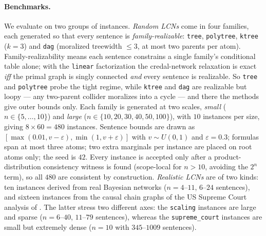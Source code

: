 \documentclass{article}
\begin{document}
\paragraph{Benchmarks.}
We evaluate on two groups of instances. \emph{Random LCNs} come in four
families, each generated so that every sentence is \emph{family-realizable}:
\texttt{tree}, \texttt{polytree}, \texttt{ktree} ($k{=}3$) and \texttt{dag}
(moralized treewidth $\le 3$, at most two parents per atom). Family-realizability means each sentence constrains a single family's conditional
table alone; with the \texttt{linear} factorization the credal-network relaxation
is exact \emph{iff} the primal graph is singly connected \emph{and} every sentence
is realizable. So \texttt{tree} and \texttt{polytree} probe the tight regime, while
\texttt{ktree} and \texttt{dag} are realizable but loopy --- any two-parent collider
moralizes into a cycle --- and there the methods give outer bounds only. Each family is
generated at two scales, \emph{small} ($n \in \{5,\dots,10\}$) and \emph{large}
($n \in \{10,20,30,40,50,100\}$), with $10$ instances per size, giving
$8 \times 60 = 480$ instances. Sentence bounds are drawn as
$[\max(0.01, v{-}\varepsilon), \min(1, v{+}\varepsilon)]$ with $v \sim U(0,1)$
and $\varepsilon = 0.3$; formulas span at most three atoms; two extra marginals
per instance are placed on root atoms only; the seed is $42$. Every instance is accepted only after a product-distribution
consistency witness is found (scope-local for $n > 10$, avoiding the $2^n$ term),
so all $480$ are consistent by construction. \emph{Realistic LCNs} are of two kinds: ten
instances derived from real Bayesian networks \cite{bn-repo} ($n = 4$--$11$,
$6$--$24$ sentences), and sixteen instances from the causal chain graphs of the
US Supreme Court analysis of \cite{ogburn2020causal}. The latter stress two
different axes: the \texttt{scaling} instances are large and sparse
($n = 6$--$40$, $11$--$79$ sentences), whereas the \texttt{supreme\_court}
instances are small but extremely dense ($n{=}10$ with $345$--$1009$ sentences).
\end{document}
